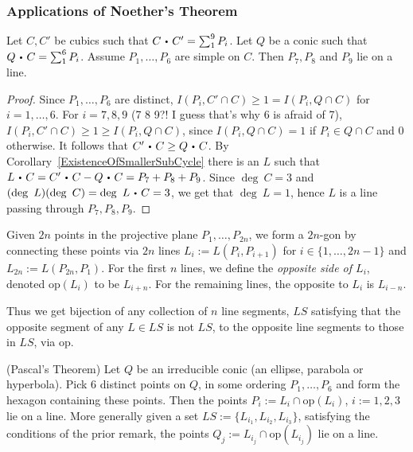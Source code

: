 \subsubsection{Applications of Noether's Theorem}
    \begin{proposition}
        Let $C,C'$ be cubics such that $C\ic C' = \sum_1^9 P_i$. Let $Q$ be a conic such that $Q\ic C = \sum_1^6 P_i$. Assume $P_1,\dots,P_6$ are simple on $C$. Then $P_7,P_8$ and $P_9$ lie on a line.
    \end{proposition}
    \begin{proof}
        Since $P_1,\dots,P_6$ are distinct, $I(P_i,C'\cap C)\geq 1 = I(P_i,Q\cap C)$ for $i=1,\dots,6$. For $i=7,8,9$ (7 8 9?! I guess that's why 6 is afraid of 7), $I(P_i,C'\cap C) \geq 1 \geq I(P_i,Q\cap C)$, since $I(P_i,Q\cap C)=1$ if $P_i\in Q\cap C$ and $0$ otherwise. It follows that $C'\ic C\geq Q\ic C$. By Corollary~\ref{ExistenceOfSmallerSubCycle} there is an $L$ such that $L\ic C = C'\ic C-Q\ic C=P_7+P_8+P_9$. Since $\deg \ C = 3$ and $(\deg\ L)(\deg\ C)= \deg \ L\ic C = 3$, we get that $\deg \ L = 1$, hence $L$ is a line passing through $P_7,P_8,P_9$.
    \end{proof}
    \begin{definition}
        Given $2n$ points in the projective plane $P_1,\dots, P_{2n}$, we form a $2n$-gon by connecting these points via $2n$ lines $L_i:= L(P_i,P_{i+1})$ for $i\in\{1,\dots,2n-1\}$ and $L_{2n}:= L(P_{2n},P_1)$. For the first $n$ lines, we define the \textit{opposite side of $L_i$}, denoted $\mathrm{op}(L_i)$ to be $L_{i+n}$. For the remaining lines, the opposite to $L_i$ is $L_{i-n}$.
    \end{definition}
    \begin{remark}
        Thus we get bijection of any collection of $n$ line segments, $LS$ satisfying that the opposite segment of any $L\in LS$ is not $LS$, to the opposite line segments to those in $LS$, via $\mathrm{op}$. 
    \end{remark}
    \begin{corollary}(Pascal's Theorem)
        Let $Q$ be an irreducible conic (an ellipse, parabola or hyperbola). Pick $6$ distinct points on $Q$, in some ordering $P_1,\dots,P_6$ and form the hexagon containing these points. Then the points $P_i:=L_i\cap\mathrm{op}(L_i)$, $i:=1,2,3$ lie on a line. More generally given a set $LS:= \{L_{i_1},L_{i_2},L_{i_3}\}$, satisfying the conditions of the prior remark, the points $Q_j:= L_{i_j}\cap \mathrm{op}(L_{i_j})$ lie on a line.   
    \end{corollary}
